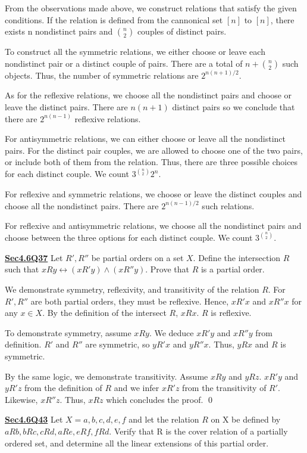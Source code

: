 \documentclass{article}
\newcommand{\new}[1]{
    \vspace{2mm}
    \noindent
    \textbf{
    \underline{#1}}
}
\begin{document}
From the observations made above, we construct relations that satisfy 
the given conditions. If the relation is defined from the cannonical 
set $[n]$ to $[n]$, there exists n nondistinct pairs and $\binom{n}{2}$
couples of distinct pairs. 

To construct all the symmetric relations, we either choose or leave 
each nondistinct pair or a distinct couple of pairs. There 
are a total of $n + \binom{n}{2}$ such objects. Thus, the 
number of symmetric relations are $\boxed{2^{n(n+1)/2}}$. 

As for the reflexive relations, we choose all the nondistinct 
pairs and choose or leave the distinct pairs. There are $n(n+1)$ 
distinct pairs so we conclude that there are $\boxed{2^{n(n-1)}}$ 
reflexive relations. 

For antisymmetric relations, we can either choose or leave 
all the nondistinct pairs. For the distinct pair couples, we 
are allowed to choose one of the two pairs, or include both of 
them from the relation. Thus, there are three possible choices 
for each distinct couple. We count $\boxed{3^{\binom{n}{2}}2^n}$. 

For reflexive and symmetric relations, we choose or 
leave the distinct couples and choose all the nondistinct pairs. There 
are $\boxed{2^{n(n-1)/2}}$ such relations. 

For reflexive and antisymmetric relations, we choose all 
the nondistinct pairs and choose between the three options 
for each distinct couple. We count $\boxed{3^{\binom{n}{2}}}$.




\new{Sec4.6Q37} Let $R', R''$ be partial orders on a set $X$. 
Define the intersection $R$ such that $xRy \leftrightarrow (xR'y) \wedge 
(xR''y)$. Prove that $R$ is a partial order. 

\proof
We demonstrate symmetry, reflexivity, and transitivity of the relation 
$R$. For $R', R''$ are both partial orders, they must be reflexive. 
Hence, $xR'x$ and $xR''x$ for any $x \in X$. By the definition of 
the intersect $R$, $xRx$. $R$ is reflexive.

To demonstrate symmetry, assume $xRy$. We deduce $xR'y$ and $xR''y$ 
from definition. $R'$ and $R''$ are symmetric, so $yR'x$ and $yR''x$. 
Thus, $yRx$ and $R$ is symmetric. 

By the same logic, we demonstrate transitivity. Assume $xRy$ and $yRz$. 
$xR'y$ and $yR'z$ from the definition of $R$ and we infer $xR'z$ from 
the transitivity of $R'$. Likewise, $xR''z$. Thus, $xRz$ which concludes 
the proof. \hfill \qed


\new{Sec4.6Q43} Let $X = {a, b, c, d, e, f}$ and let the relation $R$ on X be defined by $aRb, b R c, 
c R d, aRe, e R f, f R d$. Verify that R is the cover relation of a partially ordered 
set, and determine all the linear extensions of this partial order. 
\end{document}
